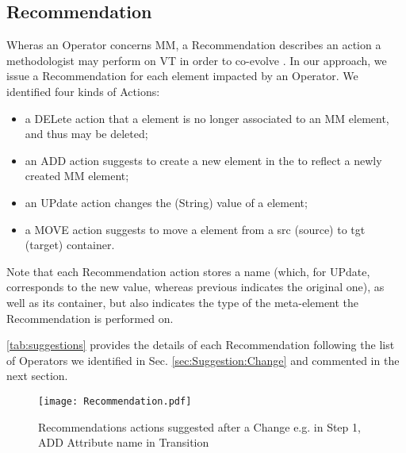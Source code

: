 \subsection{Recommendation}
\label{sec:Suggestion:Recommendation}

Wheras an \textsf{Operator} concerns \textsf{MM}, a \textsf{Recommendation} 
describes an action a methodologist may perform on \textsf{VT} in order to
co-evolve \viewtypes. 
In our approach, we issue a \textsf{Recommendation} for each \viewtype element 
\textsf{impacted} by an \textsf{Operator}. We identified four kinds of \textsf{Action}s: 
\begin{itemize}
	\item a \textsf{DEL}ete action that a \viewtype element is no longer associated
	to an \textsf{MM} element, and thus may be deleted;
	\item an \textsf{ADD} action suggests to create a new element in the \viewtype
	to reflect a newly created \textsf{MM} element;
	\item an \textsf{UP}date action changes the (String) value of a \viewtype element;
	\item a \textsf{MOVE} action suggests to move a \viewtype element from a \textsf{src}
	(source) to \textsf{tgt} (target) container.
\end{itemize}
Note that each \textsf{Recommendation} action stores a \textsf{name} (which, for
\textsf{UP}date, corresponds to the new value, whereas \textsf{previous} 
indicates the original one), as well as its \textsf{container}, but also 
indicates the \textsf{type} of the \viewtype meta-element the 
\textsf{Recommendation} is performed on.

\autoref{tab:suggestions} provides the details of each \textsf{Recommendation} 
following the list of \textsf{Operator}s we identified in Sec. 
\ref{sec:Suggestion:Change} and commented in the next section.

\begin{figure}[t]
    \centering
    \texttt{[image: Recommendation.pdf]}
    \caption{\textsf{Recommendation}s actions suggested after a \textsf{Change}
    e.g. in Step 1, \textsf{ADD} Attribute \textsf{name} in \textsf{Transition}}
    \label{fig:Recommendation}
\end{figure}